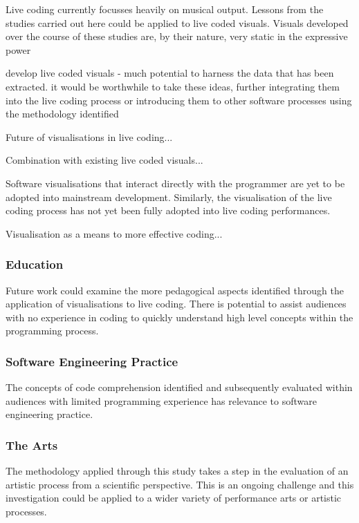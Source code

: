 Live coding currently focusses heavily on musical output. Lessons from the studies carried out here could be applied to live coded visuals. Visuals developed over the course of these studies are, by their nature, very static in the expressive power 

develop live coded visuals - much potential to harness the data that has been extracted. it would be worthwhile to take these ideas, further integrating them into the live coding process or introducing them to other software processes using the methodology identified

Future of visualisations in live coding...

Combination with existing live coded visuals...

Software visualisations that interact directly with the programmer are yet to be adopted into mainstream development. Similarly, the visualisation of the live coding process has not yet been fully adopted into live coding performances.

Visualisation as a means to more effective coding...


\subsubsection{Education}

Future work could examine the more pedagogical aspects identified through the application of visualisations to live coding. There is potential to assist audiences with no experience in coding to quickly understand high level concepts within the programming process. \more

\subsubsection{Software Engineering Practice}

The concepts of code comprehension identified and subsequently evaluated within audiences with limited programming experience has relevance to software engineering practice. \more

\subsubsection{The Arts}

The methodology applied through this study takes a step in the evaluation of an artistic process from a scientific perspective. This is an ongoing challenge and this investigation could be applied to a wider variety of performance arts or artistic processes. \more


